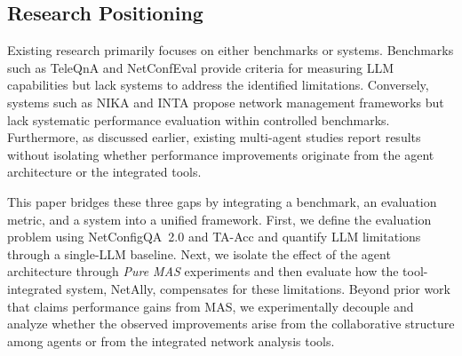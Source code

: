 \subsection{Research Positioning}

Existing research primarily focuses on either benchmarks or systems. Benchmarks such as TeleQnA and NetConfEval provide criteria for measuring LLM capabilities but lack systems to address the identified limitations. Conversely, systems such as NIKA and INTA propose network management frameworks but lack systematic performance evaluation within controlled benchmarks. Furthermore, as discussed earlier, existing multi-agent studies report results without isolating whether performance improvements originate from the agent architecture or the integrated tools.

This paper bridges these three gaps by integrating a benchmark, an evaluation metric, and a system into a unified framework. First, we define the evaluation problem using NetConfigQA~2.0 and TA-Acc and quantify LLM limitations through a single-LLM baseline. Next, we isolate the effect of the agent architecture through \emph{Pure MAS} experiments and then evaluate how the tool-integrated system, NetAlly, compensates for these limitations. Beyond prior work that claims performance gains from MAS, we experimentally decouple and analyze whether the observed improvements arise from the collaborative structure among agents or from the integrated network analysis tools.




